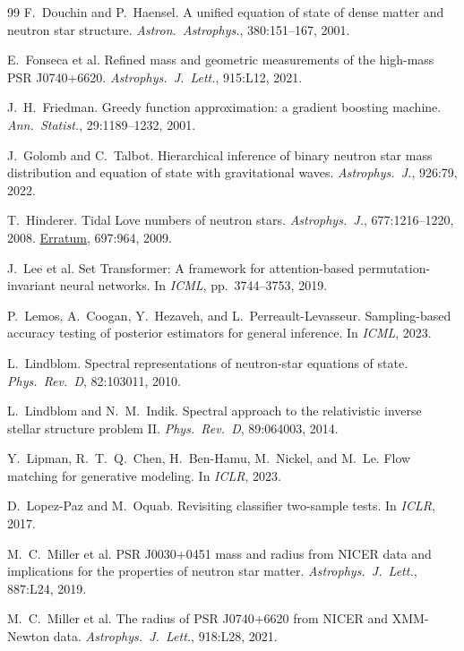 \documentclass{article}
\begin{document}
\begin{thebibliography}{99}
 F.~Douchin and P.~Haensel. A unified equation of state of dense matter and neutron star structure. \emph{Astron.\ Astrophys.}, 380:151--167, 2001.

 E.~Fonseca et al. Refined mass and geometric measurements of the high-mass PSR J0740+6620. \emph{Astrophys.\ J.\ Lett.}, 915:L12, 2021.

 J.~H.~Friedman. Greedy function approximation: a gradient boosting machine. \emph{Ann.\ Statist.}, 29:1189--1232, 2001.

 J.~Golomb and C.~Talbot. Hierarchical inference of binary neutron star mass distribution and equation of state with gravitational waves. \emph{Astrophys.\ J.}, 926:79, 2022.

 T.~Hinderer. Tidal Love numbers of neutron stars. \emph{Astrophys.\ J.}, 677:1216--1220, 2008. \href{https://doi.org/10.1088/0004-637X/697/1/964}{Erratum}, 697:964, 2009.

 J.~Lee et al. Set Transformer: A framework for attention-based permutation-invariant neural networks. In \emph{ICML}, pp.\ 3744--3753, 2019.

 P.~Lemos, A.~Coogan, Y.~Hezaveh, and L.~Perreault-Levasseur. Sampling-based accuracy testing of posterior estimators for general inference. In \emph{ICML}, 2023.

 L.~Lindblom. Spectral representations of neutron-star equations of state. \emph{Phys.\ Rev.\ D}, 82:103011, 2010.

 L.~Lindblom and N.~M.~Indik. Spectral approach to the relativistic inverse stellar structure problem II. \emph{Phys.\ Rev.\ D}, 89:064003, 2014.

 Y.~Lipman, R.~T.~Q.~Chen, H.~Ben-Hamu, M.~Nickel, and M.~Le. Flow matching for generative modeling. In \emph{ICLR}, 2023.

 D.~Lopez-Paz and M.~Oquab. Revisiting classifier two-sample tests. In \emph{ICLR}, 2017.

 M.~C.~Miller et al. PSR J0030+0451 mass and radius from NICER data and implications for the properties of neutron star matter. \emph{Astrophys.\ J.\ Lett.}, 887:L24, 2019.

 M.~C.~Miller et al. The radius of PSR J0740+6620 from NICER and XMM-Newton data. \emph{Astrophys.\ J.\ Lett.}, 918:L28, 2021.


\end{thebibliography}
\end{document}

